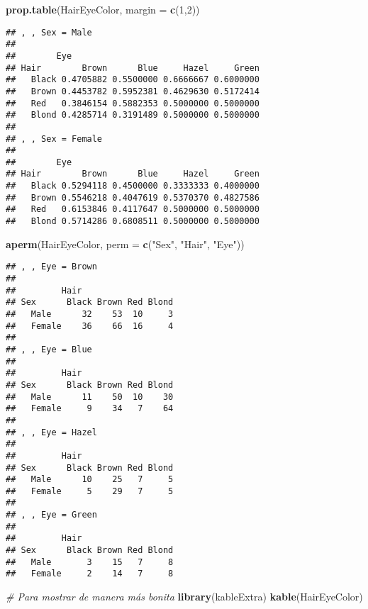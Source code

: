 \documentclass[
]{article}
\newenvironment{Shaded}{\begin{snugshade}}{\end{snugshade}}
\newcommand{\CommentTok}[1]{\textcolor[rgb]{0.56,0.35,0.01}{\textit{#1}}}
\newcommand{\DataTypeTok}[1]{\textcolor[rgb]{0.13,0.29,0.53}{#1}}
\newcommand{\DecValTok}[1]{\textcolor[rgb]{0.00,0.00,0.81}{#1}}
\newcommand{\KeywordTok}[1]{\textcolor[rgb]{0.13,0.29,0.53}{\textbf{#1}}}
\newcommand{\NormalTok}[1]{#1}
\newcommand{\StringTok}[1]{\textcolor[rgb]{0.31,0.60,0.02}{#1}}
\begin{document}
\begin{Shaded}
\begin{Highlighting}[]
\KeywordTok{prop.table}\NormalTok{(HairEyeColor, }\DataTypeTok{margin =} \KeywordTok{c}\NormalTok{(}\DecValTok{1}\NormalTok{,}\DecValTok{2}\NormalTok{))}
\end{Highlighting}
\end{Shaded}

\begin{verbatim}
## , , Sex = Male
## 
##        Eye
## Hair        Brown      Blue     Hazel     Green
##   Black 0.4705882 0.5500000 0.6666667 0.6000000
##   Brown 0.4453782 0.5952381 0.4629630 0.5172414
##   Red   0.3846154 0.5882353 0.5000000 0.5000000
##   Blond 0.4285714 0.3191489 0.5000000 0.5000000
## 
## , , Sex = Female
## 
##        Eye
## Hair        Brown      Blue     Hazel     Green
##   Black 0.5294118 0.4500000 0.3333333 0.4000000
##   Brown 0.5546218 0.4047619 0.5370370 0.4827586
##   Red   0.6153846 0.4117647 0.5000000 0.5000000
##   Blond 0.5714286 0.6808511 0.5000000 0.5000000
\end{verbatim}

\begin{Shaded}
\begin{Highlighting}[]
\KeywordTok{aperm}\NormalTok{(HairEyeColor, }\DataTypeTok{perm =} \KeywordTok{c}\NormalTok{(}\StringTok{"Sex"}\NormalTok{, }\StringTok{"Hair"}\NormalTok{, }\StringTok{"Eye"}\NormalTok{))}
\end{Highlighting}
\end{Shaded}

\begin{verbatim}
## , , Eye = Brown
## 
##         Hair
## Sex      Black Brown Red Blond
##   Male      32    53  10     3
##   Female    36    66  16     4
## 
## , , Eye = Blue
## 
##         Hair
## Sex      Black Brown Red Blond
##   Male      11    50  10    30
##   Female     9    34   7    64
## 
## , , Eye = Hazel
## 
##         Hair
## Sex      Black Brown Red Blond
##   Male      10    25   7     5
##   Female     5    29   7     5
## 
## , , Eye = Green
## 
##         Hair
## Sex      Black Brown Red Blond
##   Male       3    15   7     8
##   Female     2    14   7     8
\end{verbatim}

\begin{Shaded}
\begin{Highlighting}[]
\CommentTok{# Para mostrar de manera más bonita}
\KeywordTok{library}\NormalTok{(kableExtra)}
\KeywordTok{kable}\NormalTok{(HairEyeColor)}
\end{Highlighting}
\end{Shaded}
\end{document}
